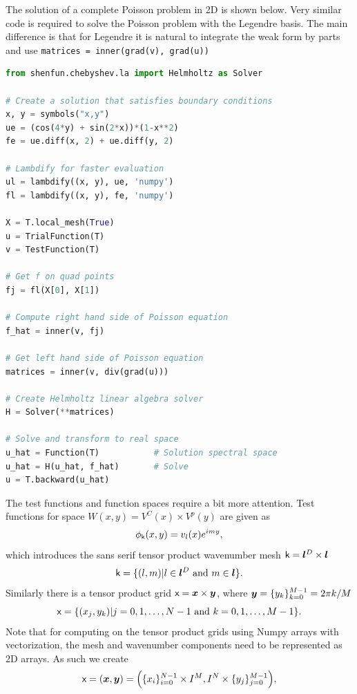 \documentclass[%
oneside,                 %
final,                   %
10pt]{article}
\theoremstyle{definition}
\begin{document}
The solution of a complete Poisson problem in 2D is shown below. Very similar code is required to solve the Poisson problem with the Legendre basis. The main difference is that for Legendre it is natural to integrate the weak form by parts and use \texttt{matrices = inner(grad(v), grad(u))}
\begin{lstlisting}[language=Python,style=yellow2_fb]
from shenfun.chebyshev.la import Helmholtz as Solver

# Create a solution that satisfies boundary conditions
x, y = symbols("x,y")
ue = (cos(4*y) + sin(2*x))*(1-x**2)
fe = ue.diff(x, 2) + ue.diff(y, 2)

# Lambdify for faster evaluation
ul = lambdify((x, y), ue, 'numpy')
fl = lambdify((x, y), fe, 'numpy')

X = T.local_mesh(True)
u = TrialFunction(T)
v = TestFunction(T)

# Get f on quad points
fj = fl(X[0], X[1])

# Compute right hand side of Poisson equation
f_hat = inner(v, fj)

# Get left hand side of Poisson equation
matrices = inner(v, div(grad(u)))

# Create Helmholtz linear algebra solver
H = Solver(**matrices)

# Solve and transform to real space
u_hat = Function(T)           # Solution spectral space
u_hat = H(u_hat, f_hat)       # Solve
u = T.backward(u_hat)
\end{lstlisting}
The test functions and function spaces require a bit more attention. Test functions for space $W(x, y)=V^C(x) \times V^p(y)$ are given as
\begin{equation}
\phi_{\boldsymbol{\textsf{k}}}(x, y) = v_l(x) e^{imy},
\end{equation}
which introduces the sans serif tensor product wavenumber mesh $\boldsymbol{\textsf{k}} = \boldsymbol{l}^D \times \boldsymbol{l}$
\begin{equation}
 \boldsymbol{\textsf{k}} = \{ (l, m) | l \in \boldsymbol{l}^D \text{ and } m \in \boldsymbol{l}\}.
\end{equation}
Similarly there is a tensor product grid $\boldsymbol{\textsf{x}} = \boldsymbol{x} \times \boldsymbol{y}$, where $\boldsymbol{y} = \{y_k\}_{k=0}^{M-1} = 2 \pi k /M$
\begin{equation}
 \boldsymbol{\textsf{x}} = \{ (x_j, y_k) | j=0,1,\ldots, N-1 \text{ and } k=0,1,\ldots, M-1\}.
\end{equation}
Note that for computing on the tensor product grids using Numpy arrays with vectorization, the mesh and wavenumber components need to be represented as 2D arrays. As such we create
\begin{equation}
\boldsymbol{\textsf{x}} = (\boldsymbol{x}, \boldsymbol{y}) = \Big(\{x_i\}_{i=0}^{N-1} \times I^M,  I^N \times \{y_j\}_{j=0}^{M-1} \Big),
\end{equation}
\end{document}
